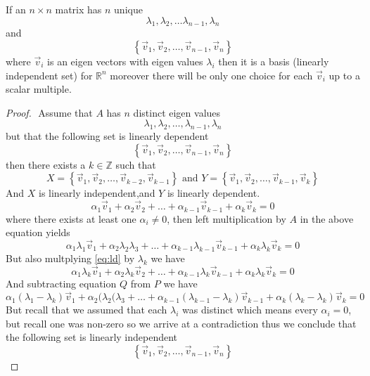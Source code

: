 \documentclass[11pt]{book}
\begin{document}
\begin{thm}\label{thm:n_distinct_eigen_values_}
    If an $n\times n$ matrix has $n$ unique 
    \[
    \lambda _{1},  \lambda _{2},  \dotsc   \lambda _{n - 1},  \lambda _{n}
    \]
    and 
    \[
    \left\{ \vec{v} _{1} , \vec{v} _{2} , \dotsc  , \vec{v} _{n - 1} , \vec{v} _{n}  \right\} 
    \]
    where $\vec{v} _{i} $ is an eigen vectors with eigen values $\lambda _{i} $ then it is a basis (linearly independent set) for $\mathbb{R} ^{n} $  
    moreover there will be only one choice for each $\vec{v} _{i} $ up to a scalar multiple.
\end{thm}

\begin{proof}
$ $\newline
Assume that $A$ has $n$ distinct eigen values  
\[
    \lambda _{1}, \lambda _{2},  \ldots,  \lambda _{n - 1}, \lambda _{n}  
\]
but that the following set is linearly dependent  
\[
\left\{ \vec{v} _{1}, \vec{v} _{2},  \ldots,  \vec{v} _{n - 1}, \vec{v} _{n}   \right\} 
\]
then there exists a $k\in \mathbb{Z} $ such that 
\[
X = \left\{ \vec{v} _{1}, \vec{v} _{2},  \ldots,  \vec{v} _{k - 2}, \vec{v} _{k - 1} \right\} \text{ and }  Y = \left\{ \vec{v} _{1}, \vec{v} _{2},  \ldots,  \vec{v} _{k - 1}, \vec{v} _{k} \right\} 
\]
And $X$ is linearly independent,and $Y$  is linearly dependent.
\[
    \alpha _{1}\vec{v} _{1}  +  \alpha _{2}\vec{v} _{2} +   \ldots +   \alpha _{k - 1}\vec{v} _{k - 1} +  \alpha _{k}\vec{v} _{k} = 0 \label{eq:ld} \tag{$\kappa$} 
\]
where there exists at least one $\alpha _{i} \neq 0$, then left multiplication by $A$ in the above equation yields  
\[
    \alpha _{1}\lambda _{1}\vec{v} _{1}  +  \alpha _{2}\lambda _{2}\lambda _{3}  +   \ldots  +   \alpha _{k - 1}\lambda _{k - 1}\vec{v} _{k - 1}  +  \alpha _{k}\lambda _{k}\vec{v} _{k}  = 0 \label{eq:ldgi} \tag{P} 
\]
But also multplying \eqref{eq:ld} by $\lambda _{k} $ we have 
\[
    \alpha _{1}\lambda _{k} \vec{v} _{1}  +  \alpha _{2}\lambda _{k} \vec{v} _{2} +   \ldots +   \alpha _{k - 1}\lambda _{k} \vec{v} _{k - 1} +  \alpha _{k}\lambda _{k} \vec{v} _{k} = 0 \label{eq:ldg} \tag{Q} 
\]
And subtracting equation $Q$ from $P$ we have 
\[
    \alpha _{1}(\lambda _{1} - \lambda _{k} )\vec{v} _{1}  +      \alpha _{2}(\lambda _{2}(\lambda _{3}  +   \ldots  +       \alpha _{k - 1}(\lambda _{k - 1} - \lambda _{k} )\vec{v} _{k - 1}  +      \alpha _{k}(\lambda _{k} - \lambda _{k} )\vec{v} _{k}  = 0
\]
But recall that we assumed that each $\lambda _{i} $ was distinct which means every $\alpha _{i} = 0$, but recall one was non-zero so we arrive at a contradiction thus we conclude that the following set is linearly independent 
\[
\left\{ \vec{v} _{1}, \vec{v} _{2},  \ldots,  \vec{v} _{n - 1}, \vec{v} _{n}   \right\} 
\]
\end{proof}
\end{document}
